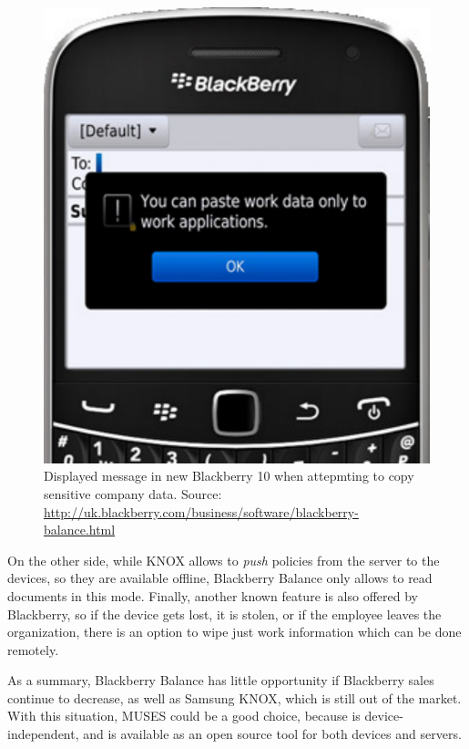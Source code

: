 \begin{figure}
	\centering
	\includegraphics[scale =0.5] {gfx/byodSotA/Blackberry_balance.pdf}
	\caption{Displayed message in new Blackberry 10 when attepmting to copy sensitive company data. Source: \url{http://uk.blackberry.com/business/software/blackberry-balance.html}}
	\label{fig:blackberry_bal}
\end{figure}

On the other side, while KNOX allows to \textit{push} policies from the server to the devices, so they are available offline, Blackberry Balance only allows to read documents in this mode. Finally, another known feature is also offered by Blackberry, so if the device gets lost, it is stolen, or if the employee leaves the organization, there is an option to wipe just work information which can be done remotely.

As a summary, Blackberry Balance has little opportunity if Blackberry sales continue to decrease, as well as Samsung KNOX, which is still out of the market. With this situation, MUSES could be a good choice, because is device-independent, and is available as an open source tool for both devices and servers.

